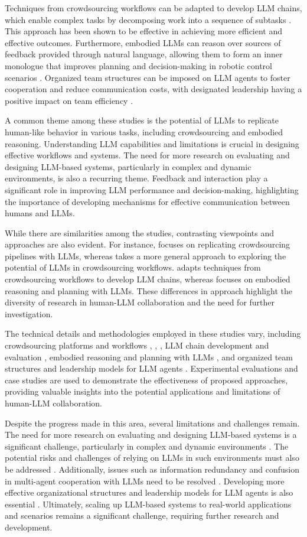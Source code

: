 \documentclass[conference]{IEEEtran}
\begin{document}
Techniques from crowdsourcing workflows can be adapted to develop LLM chains, which enable complex tasks by decomposing work into a sequence of subtasks \cite{b3}. This approach has been shown to be effective in achieving more efficient and effective outcomes. Furthermore, embodied LLMs can reason over sources of feedback provided through natural language, allowing them to form an inner monologue that improves planning and decision-making in robotic control scenarios \cite{b4}. Organized team structures can be imposed on LLM agents to foster cooperation and reduce communication costs, with designated leadership having a positive impact on team efficiency \cite{b5}.

A common theme among these studies is the potential of LLMs to replicate human-like behavior in various tasks, including crowdsourcing and embodied reasoning. Understanding LLM capabilities and limitations is crucial in designing effective workflows and systems. The need for more research on evaluating and designing LLM-based systems, particularly in complex and dynamic environments, is also a recurring theme. Feedback and interaction play a significant role in improving LLM performance and decision-making, highlighting the importance of developing mechanisms for effective communication between humans and LLMs.

While there are similarities among the studies, contrasting viewpoints and approaches are also evident. For instance, \cite{b1} focuses on replicating crowdsourcing pipelines with LLMs, whereas \cite{b2} takes a more general approach to exploring the potential of LLMs in crowdsourcing workflows. \cite{b3} adapts techniques from crowdsourcing workflows to develop LLM chains, whereas \cite{b4} focuses on embodied reasoning and planning with LLMs. These differences in approach highlight the diversity of research in human-LLM collaboration and the need for further investigation.

The technical details and methodologies employed in these studies vary, including crowdsourcing platforms and workflows \cite{b1}, \cite{b2}, \cite{b3}, LLM chain development and evaluation \cite{b3}, embodied reasoning and planning with LLMs \cite{b4}, and organized team structures and leadership models for LLM agents \cite{b5}. Experimental evaluations and case studies are used to demonstrate the effectiveness of proposed approaches, providing valuable insights into the potential applications and limitations of human-LLM collaboration.

Despite the progress made in this area, several limitations and challenges remain. The need for more research on evaluating and designing LLM-based systems is a significant challenge, particularly in complex and dynamic environments \cite{b2}. The potential risks and challenges of relying on LLMs in such environments must also be addressed \cite{b1}. Additionally, issues such as information redundancy and confusion in multi-agent cooperation with LLMs need to be resolved \cite{b5}. Developing more effective organizational structures and leadership models for LLM agents is also essential \cite{b5}. Ultimately, scaling up LLM-based systems to real-world applications and scenarios remains a significant challenge, requiring further research and development.
\end{document}
